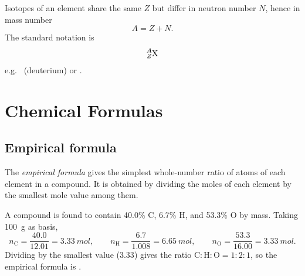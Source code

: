 \documentclass[11pt]{article}
\numberwithin{equation}{section}
\numberwithin{figure}{section}
\begin{document}
	\begin{concept}
		Isotopes of an element share the same $Z$ but differ in neutron number $N$, hence in mass number
		\begin{equation}
			A = Z + N.
		\end{equation}
		The standard notation is
		\begin{equation}
			\chem{^{$A$}_{$Z$}X}
		\end{equation}
		e.g.\  (deuterium) or .
	\end{concept}
	
	\section{Chemical Formulas}

	\subsection{Empirical formula}
	
	\begin{concept}
		The \emph{empirical formula} gives the simplest whole-number ratio of atoms of each element in a compound.
		It is obtained by dividing the moles of each element by the smallest mole value among them.
	\end{concept}

	\begin{workedexample}
		A compound is found to contain 40.0\% C, 6.7\% H, and 53.3\% O by mass. Taking \SI{100}{g} as basis,
		\begin{equation}
			n_{\mathrm C} = \frac{40.0}{12.01} = \SI{3.33}{mol}, \qquad
			n_{\mathrm H} = \frac{6.7}{1.008} = \SI{6.65}{mol}, \qquad
			n_{\mathrm O} = \frac{53.3}{16.00} = \SI{3.33}{mol}.
		\end{equation}
		Dividing by the smallest value ($3.33$) gives the ratio $\mathrm{C}:\mathrm{H}:\mathrm{O} = 1:2:1$, so the empirical formula is .
	\end{workedexample}
\end{document}
